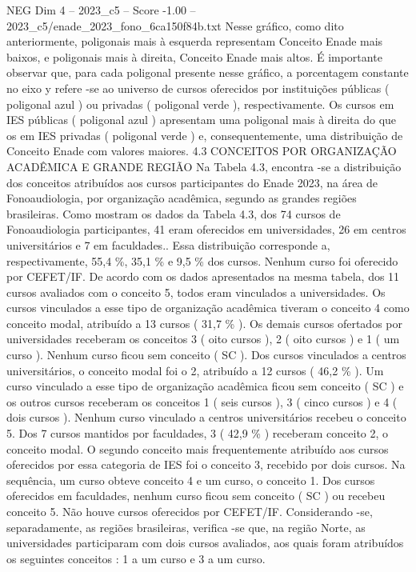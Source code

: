 \begin{textsample}{NEG Dim 4 – 2023\_c5 – Score -1.00 – 2023\_c5/enade\_2023\_fono\_6ca150f84b.txt}
Nesse gráfico, como dito anteriormente, poligonais mais à esquerda representam Conceito Enade mais baixos, e poligonais mais à direita, Conceito Enade mais altos.
É importante observar que, para cada poligonal presente nesse gráfico, a porcentagem constante no eixo y refere -se ao universo de cursos oferecidos por instituições públicas ( poligonal azul ) ou privadas ( poligonal verde ), respectivamente.
Os cursos em IES públicas ( poligonal azul ) apresentam uma poligonal mais à direita do que os em IES privadas ( poligonal verde ) e, consequentemente, uma distribuição de Conceito Enade com valores maiores. 4.3 CONCEITOS POR ORGANIZAÇÃO ACADÊMICA E GRANDE REGIÃO Na Tabela 4.3, encontra -se a distribuição dos conceitos atribuídos aos cursos participantes do Enade 2023, na área de Fonoaudiologia, por organização acadêmica, segundo as grandes regiões brasileiras.
Como mostram os dados da Tabela 4.3, dos 74 cursos de Fonoaudiologia participantes, 41 eram oferecidos em universidades, 26 em centros universitários e 7 em faculdades..
Essa distribuição corresponde a, respectivamente, 55,4 \%, 35,1 \% e 9,5 \% dos cursos.
Nenhum curso foi oferecido por CEFET/IF.
De acordo com os dados apresentados na mesma tabela, dos 11 cursos avaliados com o conceito 5, todos eram vinculados a universidades.
Os cursos vinculados a esse tipo de organização acadêmica tiveram o conceito 4 como conceito modal, atribuído a 13 cursos ( 31,7 \% ).
Os demais cursos ofertados por universidades receberam os conceitos 3 ( oito cursos ), 2 ( oito cursos ) e 1 ( um curso ).
Nenhum curso ficou sem conceito ( SC ).
Dos cursos vinculados a centros universitários, o conceito modal foi o 2, atribuído a 12 cursos ( 46,2 \% ).
Um curso vinculado a esse tipo de organização acadêmica ficou sem conceito ( SC ) e os outros cursos receberam os conceitos 1 ( seis cursos ), 3 ( cinco cursos ) e 4 ( dois cursos ).
Nenhum curso vinculado a centros universitários recebeu o conceito 5.
Dos 7 cursos mantidos por faculdades, 3 ( 42,9 \% ) receberam conceito 2, o conceito modal.
O segundo conceito mais frequentemente atribuído aos cursos oferecidos por essa categoria de IES foi o conceito 3, recebido por dois cursos.
Na sequência, um curso obteve conceito 4 e um curso, o conceito 1.
Dos cursos oferecidos em faculdades, nenhum curso ficou sem conceito ( SC ) ou recebeu conceito 5.
Não houve cursos oferecidos por CEFET/IF.
Considerando -se, separadamente, as regiões brasileiras, verifica -se que, na região Norte, as universidades participaram com dois cursos avaliados, aos quais foram atribuídos os seguintes conceitos : 1 a um curso e 3 a um curso.

\end{textsample}
